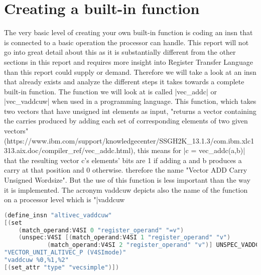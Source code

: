 \chapter{Creating a built-in function}
\label{chapter:insn coding}

The very basic level of creating your own built-in function is coding an insn that is connected to a basic operation the processor can handle.
This report will not go into great detail about this as it is substantially different from the other sections in this report and requires more insight into Register Transfer Language than this report could supply or demand.
Therefore we will take a look at an insn that already exists and analyze the different steps it takes towards a complete built-in function.
The function we will look at is called |vec_addc| or |vec_vaddcuw| when used in a programming language.
This function, which takes two vectors that have unsigned int elements as input, "returns a vector containing the carries produced by adding each set of corresponding elements of two given vectors" (https://www.ibm.com/support/knowledgecenter/SSGH2K\_13.1.3/com.ibm.xlc1313.aix.doc/compiler\_ref/vec\_addc.html), this means for |c = vec_addc(a,b)| that the resulting vector c's elements' bits are 1 if adding a and b produces a carry at that position and 0 otherwise. therefore the name "Vector ADD Carry Unsigned Wordsize". But the use of this function is less important than the way it is implemented.
The acronym vaddcuw depicts also the name of the function on a processor level which is "|vaddcuw  %
\begin{lstlisting}[language=C++,basicstyle=\ttfamily\scriptsize,keywordstyle=\color{red}]
(define_insn "altivec_vaddcuw"
[(set
	(match_operand:V4SI 0 "register_operand" "=v")
	(unspec:V4SI [(match_operand:V4SI 1 "register_operand" "v")
			(match_operand:V4SI 2 "register_operand" "v")] UNSPEC_VADDCUW))]
"VECTOR_UNIT_ALTIVEC_P (V4SImode)"
"vaddcuw %0,%1,%2"
[(set_attr "type" "vecsimple")])
\end{lstlisting}

